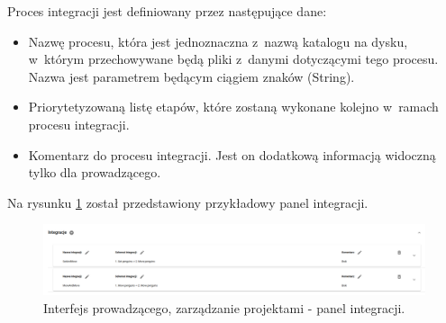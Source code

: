 Proces integracji jest definiowany przez następujące dane:
\begin {itemize}
    \item Nazwę procesu, która jest jednoznaczna z~nazwą katalogu na dysku, w~którym przechowywane będą pliki z~danymi dotyczącymi tego procesu.
    Nazwa jest parametrem będącym ciągiem znaków (String).
    \item Priorytetyzowaną listę etapów, które zostaną wykonane kolejno w~ramach procesu integracji.
    \item Komentarz do procesu integracji.
    Jest on dodatkową informacją widoczną tylko dla prowadzącego.
\end {itemize}

Na rysunku \ref{fig:lecturer_integrations} został przedstawiony przykładowy panel integracji.

\begin{figure}[h]
    \centering
    \includegraphics[width = 16cm]{chapter04/lecturer_integrations.png}
    \caption{Interfejs prowadzącego, zarządzanie projektami - panel integracji.}
    \label{fig:lecturer_integrations}
\end{figure}

